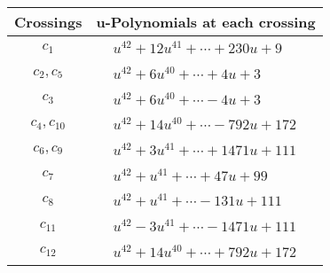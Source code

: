 \documentclass[1p]{elsarticle_modified}
\theoremstyle{definition}
\begin{document}
\begin{tabular}{m{50pt}|m{274pt}}
Crossings & \hspace{64pt}u-Polynomials at each crossing \\
\hline $$\begin{aligned}c_{1}\end{aligned}$$&$\begin{aligned}
&u^{42}+12 u^{41}+\cdots+230 u+9
\end{aligned}$\\
\hline $$\begin{aligned}c_{2},c_{5}\end{aligned}$$&$\begin{aligned}
&u^{42}+6 u^{40}+\cdots+4 u+3
\end{aligned}$\\
\hline $$\begin{aligned}c_{3}\end{aligned}$$&$\begin{aligned}
&u^{42}+6 u^{40}+\cdots-4 u+3
\end{aligned}$\\
\hline $$\begin{aligned}c_{4},c_{10}\end{aligned}$$&$\begin{aligned}
&u^{42}+14 u^{40}+\cdots-792 u+172
\end{aligned}$\\
\hline $$\begin{aligned}c_{6},c_{9}\end{aligned}$$&$\begin{aligned}
&u^{42}+3 u^{41}+\cdots+1471 u+111
\end{aligned}$\\
\hline $$\begin{aligned}c_{7}\end{aligned}$$&$\begin{aligned}
&u^{42}+u^{41}+\cdots+47 u+99
\end{aligned}$\\
\hline $$\begin{aligned}c_{8}\end{aligned}$$&$\begin{aligned}
&u^{42}+u^{41}+\cdots-131 u+111
\end{aligned}$\\
\hline $$\begin{aligned}c_{11}\end{aligned}$$&$\begin{aligned}
&u^{42}-3 u^{41}+\cdots-1471 u+111
\end{aligned}$\\
\hline $$\begin{aligned}c_{12}\end{aligned}$$&$\begin{aligned}
&u^{42}+14 u^{40}+\cdots+792 u+172
\end{aligned}$\\
\hline
\end{tabular}\\~\\
\end{document}
